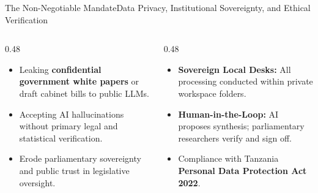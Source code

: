 \documentclass[aspectratio=169, 10pt]{beamer}
\begin{document}
\begin{frame}{The Non-Negotiable Mandate}{Data Privacy, Institutional Sovereignty, and Ethical Verification}
  \begin{columns}[c]
    \begin{column}{0.48\textwidth}
      \begin{tcolorbox}[colback=lightgrey, colframe=tanzaniablue, arc=1.5mm, boxrule=0.8pt, title=\textbf{The Risks of Ungoverned AI}]
        \small
        \begin{itemize}
          \item Leaking \textcolor{tanzaniablue}{\textbf{confidential government white papers}} or draft cabinet bills to public LLMs.
          \item Accepting AI hallucinations without primary legal and statistical verification.
          \item Erode parliamentary sovereignty and public trust in legislative oversight.
        \end{itemize}
      \end{tcolorbox}
    \end{column}
    \begin{column}{0.48\textwidth}
      \begin{tcolorbox}[colback=calloutbg, colframe=suagreen, arc=1.5mm, boxrule=0.8pt, title=\textbf{The Ethical Guardrails}]
        \small
        \begin{itemize}
          \item \textcolor{suagreen}{\textbf{Sovereign Local Desks:}} All processing conducted within private workspace folders.
          \item \textcolor{tanzaniablue}{\textbf{Human-in-the-Loop:}} AI proposes synthesis; parliamentary researchers verify and sign off.
          \item Compliance with Tanzania \textcolor{darkcharcoal}{\textbf{Personal Data Protection Act 2022}}.
        \end{itemize}
      \end{tcolorbox}
    \end{column}
  \end{columns}
\end{frame}
\end{document}
